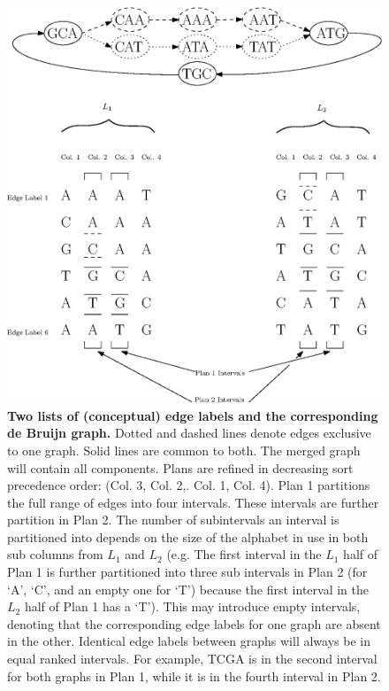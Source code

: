 \begin{figure}[h]
	\centering
	
	\includegraphics[width=.95\textwidth]{varimerge/content/partition.eps}
	\caption{{\bf Two lists of (conceptual) edge labels and the corresponding de Bruijn graph.} Dotted and dashed lines denote edges exclusive to one graph.  Solid lines are common to both.  The merged graph will contain all components.  Plans are refined in decreasing sort precedence order: (Col. 3, Col. 2,. Col. 1, Col. 4).  Plan 1 partitions the full range of edges into four intervals.  These intervals are further partition in Plan 2. The number of subintervals an interval is partitioned into depends on the size of the alphabet in use in both sub columns from $L_1$ and $L_2$ (e.g. The first interval in the $L_1$ half of Plan 1 is further partitioned into three sub intervals in Plan 2 (for `A', `C', and an empty one for `T') because the first interval in the $L_2$ half of Plan 1 has a `T').  This may introduce empty intervals, denoting that the corresponding edge labels for one graph are absent in the other.  Identical edge labels between graphs will always be in equal ranked intervals.  For example,  TCGA is in the second interval for both graphs in Plan 1, while it is in the fourth interval in Plan 2.}
	\label{figure:partition}
	
	
\end{figure}
                        

